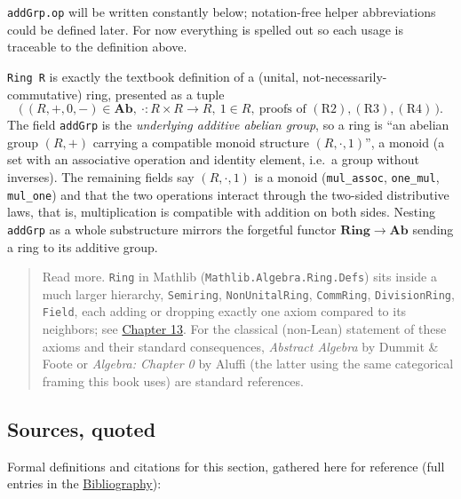 \texttt{addGrp.op} will be written constantly below; notation-free helper abbreviations could be defined later. For now everything is spelled out so each usage is traceable to the definition above.

\begin{mathreading}

\texttt{Ring R} is exactly the textbook definition of a (unital, not-necessarily-commutative) ring, presented as a tuple \[
\Big(\,(R,+,0,-)\in\mathbf{Ab},\ \cdot : R\times R\to R,\ 1\in R,\
\text{proofs of }(\mathrm{R2}),(\mathrm{R3}),(\mathrm{R4})\,\Big).
\] The field \texttt{addGrp} is the \emph{underlying additive abelian group}, so a ring is ``an abelian group \((R,+)\) carrying a compatible monoid structure \((R,\cdot,1)\)'', a monoid (a set with an associative operation and identity element, i.e.~a group without inverses). The remaining fields say \((R,\cdot,1)\) is a monoid (\texttt{mul\_\allowbreak{}assoc}, \texttt{one\_\allowbreak{}mul}, \texttt{mul\_\allowbreak{}one}) and that the two operations interact through the two-sided distributive laws, that is, multiplication is compatible with addition on both sides. Nesting \texttt{addGrp} as a whole substructure mirrors the forgetful functor \(\mathbf{Ring}\to\mathbf{Ab}\) sending a ring to its additive group.

\end{mathreading}

\begin{quote}
Read more. \texttt{Ring} in Mathlib (\texttt{Mathlib.Algebra.Ring.Defs}) sits inside a much larger hierarchy, \texttt{Semiring}, \texttt{NonUnitalRing}, \texttt{CommRing}, \texttt{DivisionRing}, \texttt{Field}, each adding or dropping exactly one axiom compared to its neighbors; see \hyperref[sec:13-next-steps:02-moving-to-mathlib:1]{Chapter 13}. For the classical (non-Lean) statement of these axioms and their standard consequences, \emph{Abstract Algebra} by Dummit \& Foote or \emph{Algebra: Chapter 0} by Aluffi (the latter using the same categorical framing this book uses) are standard references.
\end{quote}

\subsection{Sources, quoted}\label{sec:08-rings:03-ring:2}

Formal definitions and citations for this section, gathered here for reference (full entries in the \hyperref[sec:root:bibliography:1]{Bibliography}):


